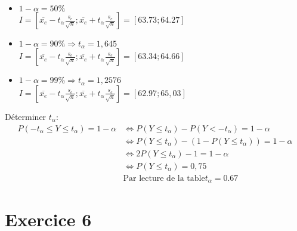 \documentclass[12pt]{report}
\begin{document}
\begin{itemize}
    \item $1- \alpha = 50\%$ \\
    $I=[\overline{x_e} - t_\alpha \frac{s_e}{\sqrt{n}};\overline{x_e} + t_\alpha \frac{s_e}{\sqrt{n}}]= [63.73;64.27]$
    \item $1-\alpha = 90\% \Rightarrow t_\alpha = 1,645$\\
    $I=[\overline{x_e} - t_\alpha \frac{s_e}{\sqrt{n}};\overline{x_e} + t_\alpha \frac{s_e}{\sqrt{n}}] = [63.34;64.66]$
    \item $1-\alpha = 99\% \Rightarrow t_\alpha = 1,2576$\\
    $I=[\overline{x_e} - t_\alpha \frac{s_e}{\sqrt{n}};\overline{x_e} + t_\alpha \frac{s_e}{\sqrt{n}}]= [62.97;65,03]$
\end{itemize}

Déterminer $t_\alpha$:\\
\begin{align*}
    P(- t_\alpha \leq Y \leq t_\alpha) = 1-\alpha &\Leftrightarrow P(Y \leq t_\alpha) - P(Y < -t_\alpha) = 1-\alpha\\
    &\Leftrightarrow P(Y \leq t_\alpha) - (1-P(Y \leq t_\alpha)) = 1 - \alpha\\
    &\Leftrightarrow 2P(Y \leq t_\alpha) -1 = 1- \alpha\\
    &\Leftrightarrow P(Y \leq t_\alpha)  = 0,75\\
    &\text{Par lecture de la table} t_\alpha = 0.67 
\end{align*}

\section{Exercice 6}
\end{document}
